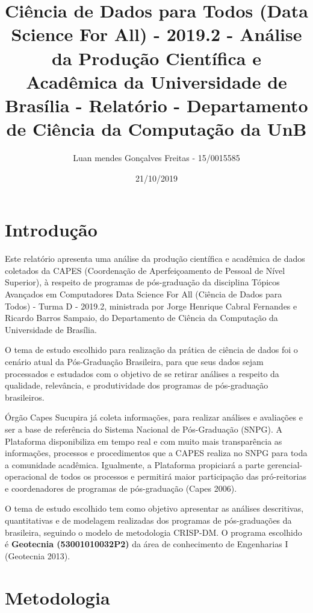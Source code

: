 \documentclass[]{article}
\title{Ciência de Dados para Todos (Data Science For All) - 2019.2 - Análise da
Produção Científica e Acadêmica da Universidade de Brasília - Relatório
- Departamento de Ciência da Computação da UnB}
\author{Luan mendes Gonçalves Freitas - 15/0015585}
\date{21/10/2019}
\begin{document}
\maketitle

{
\setcounter{tocdepth}{4}
\tableofcontents
}
\listoftables
\listoffigures

\hypertarget{introduuxe7uxe3o}{%
\section{Introdução}\label{introduuxe7uxe3o}}

Este relatório apresenta uma análise da produção científica e acadêmica
de dados coletados da CAPES (Coordenação de Aperfeiçoamento de Pessoal
de Nível Superior), à respeito de programas de pós-graduação da
disciplina Tópicos Avançados em Computadores Data Science For All
(Ciência de Dados para Todos) - Turma D - 2019.2, ministrada por Jorge
Henrique Cabral Fernandes e Ricardo Barros Sampaio, do Departamento de
Ciência da Computação da Universidade de Brasília.

O tema de estudo escolhido para realização da prática de ciência de
dados foi o cenário atual da Pós-Graduação Brasileira, para que seus
dados sejam processados e estudados com o objetivo de se retirar
análises a respeito da qualidade, relevância, e produtividade dos
programas de pós-graduação brasileiros.

Órgão Capes Sucupira já coleta informações, para realizar análises e
avaliações e ser a base de referência do Sistema Nacional de
Pós-Graduação (SNPG). A Plataforma disponibiliza em tempo real e com
muito mais transparência as informações, processos e procedimentos que a
CAPES realiza no SNPG para toda a comunidade acadêmica. Igualmente, a
Plataforma propiciará a parte gerencial-operacional de todos os
processos e permitirá maior participação das pró-reitorias e
coordenadores de programas de pós-graduação (Capes 2006).

O tema de estudo escolhido tem como objetivo apresentar as análises
descritivas, quantitativas e de modelagem realizadas dos programas de
pós-graduações da brasileira, seguindo o modelo de metodologia CRISP-DM.
O programa escolhido é \textbf{Geotecnia (53001010032P2)} da área de
conhecimento de Engenharias I (Geotecnia 2013).

\hypertarget{metodologia}{%
\section{Metodologia}\label{metodologia}}
\end{document}
